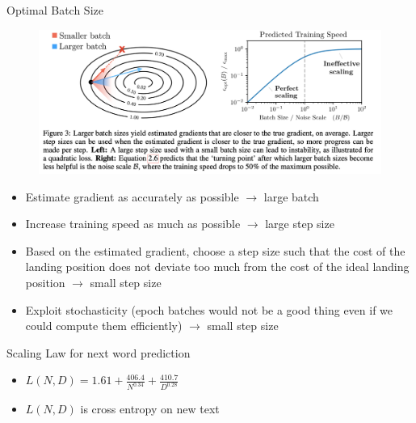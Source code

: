 \begin{vbframe}{Optimal Batch Size}

\begin{figure}
    \centering
    \includegraphics{figure/optimalbatchsize.png}
\end{figure}

\begin{itemize}
    \item Estimate gradient as accurately as possible $\rightarrow$ large batch
    \item Increase training speed as much as possible $\rightarrow$ large step size
    \item Based on the estimated gradient, choose a step size such that the cost of the landing position does not deviate too much from the cost of the ideal landing position $\rightarrow$ small step size
    \item Exploit stochasticity (epoch batches would not be a good thing even if we could compute them efficiently) $\rightarrow$ small step size

\end{itemize}

\end{vbframe}


\begin{vbframe}{Scaling Law for next word prediction}

\vfill

\begin{itemize}
    \item $L(N,D) = 1.61 + \frac{406.4}{N^{0.34}} + \frac{410.7}{D^{0.28}}$
    \item $L(N,D)$ is cross entropy on new text
\end{itemize}

\vfill

\end{vbframe}

